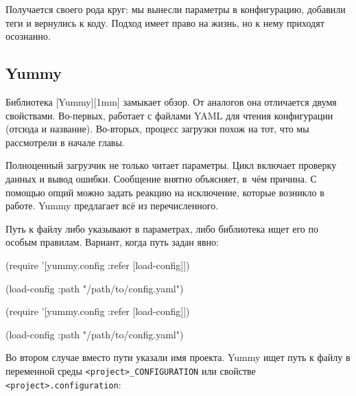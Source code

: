 Получается своего рода круг: мы вынесли параметры в конфигурацию, добавили теги
и вернулись к коду. Подход имеет право на жизнь, но к нему приходят осознанно.

\subsection{Yummy}


Библиотека [Yummy][1mm] замыкает обзор. От
аналогов она отличается двумя свойствами. Во-первых, работает с файлами YAML для
чтения конфигурации (отсюда и название). Во-вторых, процесс загрузки похож на
тот, что мы рассмотрели в начале главы.

Полноценный загрузчик не только читает параметры. Цикл включает проверку данных
и вывод ошибки. Сообщение внятно объясняет, в~чём причина. С помощью опций можно
задать реакцию на исключение, которые возникло в работе. Yummy предлагает всё из
перечисленного.

Путь к файлу либо указывают в параметрах, либо библиотека ищет его по особым
правилам. Вариант, когда путь задан явно:

\ifx\devicetype\mobile

\begin{english}
  \begin{clojure}
(require
  '[yummy.config :refer [load-config]])

(load-config
  {:path "/path/to/config.yaml"})
  \end{clojure}
\end{english}

\else

\begin{english}
  \begin{clojure}
(require '[yummy.config :refer [load-config]])

(load-config {:path "/path/to/config.yaml"})
  \end{clojure}
\end{english}

\fi

Во втором случае вместо пути указали имя проекта. Yummy ищет путь к файлу в
переменной среды \verb|<project>_CONFIGURATION| или свойстве
\verb|<project>.configuration|:

\begin{english}
\end{english}

